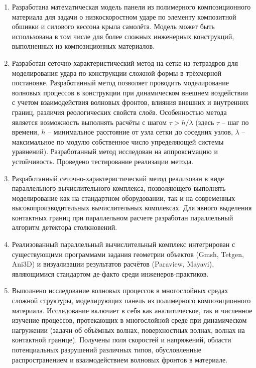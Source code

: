 \begin{enumerate}

\item Разработана математическая модель панели из полимерного композиционного материала для задачи о низкоскоростном ударе по элементу композитной обшивки и силового кессона крыла самолёта. Модель может быть использована в том числе для более сложных инженерных конструкций, выполненных из композиционных материалов.

\item Разработан сеточно-характеристический метод на сетке из тетраэдров для моделирования удара по конструкции сложной формы в трёхмерной постановке. Разработанный метод позволяет проводить моделирование волновых процессов в конструкции при динамическом внешнем воздействии с учетом взаимодействия волновых фронтов, влияния внешних и внутренних границ, различия реологических свойств слоёв. Особенностью метода является возможность выполнять расчёты с шагом $\tau > h / \lambda$ (здесь $\tau$ -- шаг по времени, $h$ -- минимальное расстояние от узла сетки до соседних узлов, $\lambda$ -- максимальное по модулю собственное число упределяющей системы уравнений). Разработанный метод исследован на аппроксимацию и устойчивость. Проведено тестирование реализации метода.

\item Разработанный сеточно-характеристический метод реализован в виде параллельного вычислительного комплекса, позволяющего выполнять моделирование как на стандартном оборудовании, так и на современных высокопроизводительных вычислительных комплексах. Для явного выделения контактных границ при параллельном расчете разработан параллельный алгоритм детектора столкновений.

\item Реализованный параллельный вычислительный комплекс интегрирован с существующими программами задания геометрии объектов (Gmsh, Tetgen, Ani3D) и визуализации результатов расчётов (Paraview, Mayavi), являющимися стандартом де-факто среди инженеров-практиков.

\item Выполнено исследование волновых процессов в многослойных средах сложной структуры, моделирующих панель из полимерного композиционного материала. Исследование включает в себя как аналитическое, так и численное изучение процессов, протекающих в многослойной среде при динамическом нагружении (задачи об объёмных волнах, поверхностных волнах, волнах на контактной границе). Получены поля скоростей и напряжений, области потенциальных разрушений различных типов, обусловленные распространением и взаимодействием волновых фронтов в материале.


\end{enumerate}
